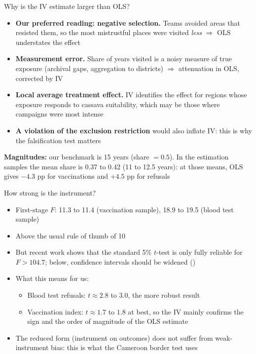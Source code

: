 \documentclass[aspectratio=1610]{beamer}
\newcommand{\refs}[1]{{\footnotesize\color{softgray}(\citealp{#1})}} %
\newcommand{\returnbutton}[1]{\par\vfill\hfill\hyperlink{#1}{\beamerreturnbutton{Back}}}
\begin{document}
\begin{frame}[label=bk-ivols]{Why is the IV estimate larger than OLS?}
  \begin{itemize}
    \item \textbf{Our preferred reading: negative selection.}
      Teams avoided areas that resisted them, so the most mistrustful places were visited \emph{less}
      $\Rightarrow$ OLS understates the effect
    \item \textbf{Measurement error.} Share of years visited is a noisy measure of true exposure
      (archival gaps, aggregation to districts) $\Rightarrow$ attenuation in OLS, corrected by IV
    \item \textbf{Local average treatment effect.} IV identifies the effect for regions whose
      exposure responds to cassava suitability, which may be those where campaigns were most intense
    \item \textbf{A violation of the exclusion restriction} would also inflate IV:
      this is why the falsification test matters
  \end{itemize}
  \vspace{0.4em}
  \textbf{Magnitudes:} our benchmark is 15 years (share $=0.5$). In the estimation samples the mean share
  is 0.37 to 0.42 (11 to 12.5 years): at those means, OLS gives $-4.3$ pp for vaccinations and $+4.5$ pp
  for refusals
  \returnbutton{main-iv}
\end{frame}

\begin{frame}[label=bk-strength]{How strong is the instrument?}
  \begin{itemize}
    \item First-stage $F$: 11.3 to 11.4 (vaccination sample), 18.9 to 19.5 (blood test sample)
    \item Above the usual rule of thumb of 10
    \item But recent work shows that the standard 5\% $t$-test is only fully reliable for
      $F > 104.7$; below, confidence intervals should be widened \refs{lee_etal_2022}
    \item What this means for us:
      \begin{itemize}
        \item Blood test refusals: $t \approx 2.8$ to $3.0$, the more robust result
        \item Vaccination index: $t \approx 1.7$ to $1.8$ at best, so the IV mainly confirms the sign
          and the order of magnitude of the OLS estimate
      \end{itemize}
    \item The reduced form (instrument on outcomes) does not suffer from weak-instrument bias:
      this is what the Cameroon border test uses
  \end{itemize}
  \returnbutton{main-relevance}
\end{frame}
\end{document}
